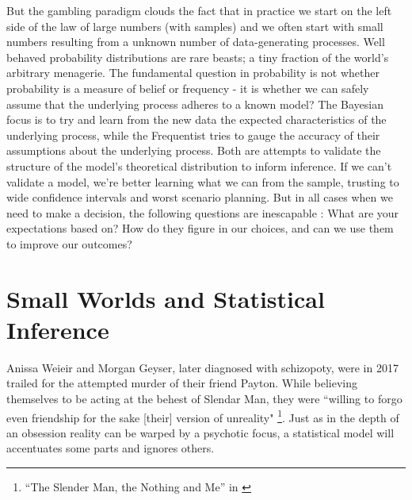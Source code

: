 \documentclass[]{tufte-book}
\theoremstyle{definition}
\theoremstyle{definition}
\theoremstyle{definition}
\theoremstyle{remark}
\begin{document}
But the gambling paradigm clouds the fact that in practice we start on the left side of the law of large numbers (with samples) and we often start with small numbers resulting from a unknown number of data-generating processes. Well behaved probability distributions are rare beasts; a tiny fraction of the world's arbitrary menagerie. The fundamental question in probability is not whether probability is a measure of belief or frequency - it is whether we can safely assume that the underlying process adheres to a known model? The Bayesian focus is to try and learn from the new data the expected characteristics of the underlying process, while the Frequentist tries to gauge the accuracy of their assumptions about the underlying process. Both are attempts to validate the structure of the model's theoretical distribution to inform inference. If we can't validate a model, we're better learning what we can from the sample, trusting to wide confidence intervals and worst scenario planning. But in all cases when we need to make a decision, the following questions are inescapable : What are your expectations based on? How do they figure in our choices, and can we use them to improve our outcomes?

\hypertarget{small-worlds-and-statistical-inference}{%
\section{Small Worlds and Statistical Inference}\label{small-worlds-and-statistical-inference}}

Anissa Weieir and Morgan Geyser, later diagnosed with schizopoty, were in 2017 trailed for the attempted murder of their friend Payton. While believing themselves to be acting at the behest of Slendar Man, they were ``willing to forgo even friendship for the sake {[}their{]} version of unreality" \footnote{``The Slender Man, the Nothing and Me'' in \citep{WangSchizophrenia}}. Just as in the depth of an obsession reality can be warped by a psychotic focus, a statistical model will accentuates some parts and ignores others.
\end{document}
